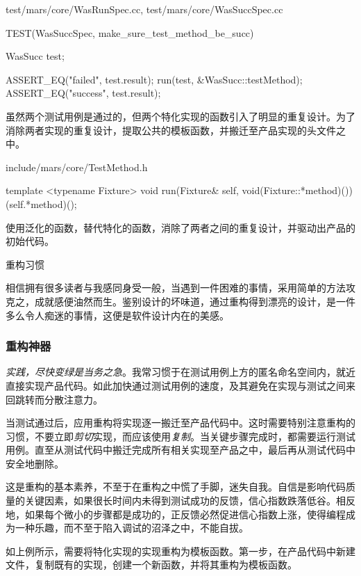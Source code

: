 \begin{content}
\begin{diff}{test/mars/core/WasRunSpec.cc, test/mars/core/WasSuccSpec.cc}
\begin{minicpp}
TEST(WasSuccSpec, make_sure_test_method_be_succ) {
  WasSucc test;

  ASSERT_EQ("failed", test.result);
  run(test, &WasSucc::testMethod);
  ASSERT_EQ("success", test.result);
}
\end{minicpp}
\end{diff}

虽然两个测试用例是通过的，但两个特化实现的函数引入了明显的重复设计。为了消除两者实现的重复设计，提取公共的模板函数，并搬迁至产品实现的头文件之中。

\begin{nodiff}{include/mars/core/TestMethod.h}
\begin{c++}
template <typename Fixture>
void run(Fixture& self, void(Fixture::*method)()) {
  (self.*method)();
}
\end{c++}
\end{nodiff}

使用泛化的函数，替代特化的函数，消除了两者之间的重复设计，并驱动出产品的初始代码。

\begin{episode}{重构习惯}
\begin{content}

相信拥有很多读者与我感同身受一般，当遇到一件困难的事情，采用简单的方法攻克之，成就感便油然而生。鉴别设计的坏味道，通过重构得到漂亮的设计，是一件多么令人痴迷的事情，这便是软件设计内在的美感。

\subsubsection{重构神器}

\emph{实践，尽快变绿是当务之急}。我常习惯于在测试用例上方的匿名命名空间内，就近直接实现产品代码。如此加快通过测试用例的速度，及其避免在实现与测试之间来回跳转而分散注意力。

当测试通过后，应用重构将实现逐一搬迁至产品代码中。这时需要特别注意重构的习惯，不要立即\emph{剪切}实现，而应该使用\emph{复制}。当关键步骤完成时，都需要运行测试用例。直至从测试代码中搬迁完成所有相关实现至产品之中，最后再从测试代码中安全地删除。

这是重构的基本素养，不至于在重构之中慌了手脚，迷失自我。自信是影响代码质量的关键因素，如果很长时间内未得到测试成功的反馈，信心指数跌落低谷。相反地，如果每个微小的步骤都是成功的，正反馈必然促进信心指数上涨，使得编程成为一种乐趣，而不至于陷入调试的沼泽之中，不能自拔。

如上例所示，需要将特化实现的实现重构为模板函数。第一步，在产品代码中新建文件，复制既有的实现，创建一个新函数，并将其重构为模板函数。


\end{content}
\end{episode}
\end{content}
